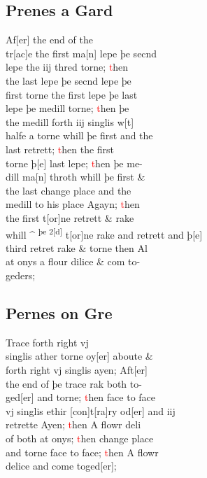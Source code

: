 \documentclass[12pt,letter]{article} %
\newcommand{\red}[1]{\textcolor{red}{#1}}
\newcommand{\srcpg}[1]{
    \noindent{
        \color{Gray}{\rule[0.5ex]{\linewidth}{1pt}~#1} 
        \\
    }
}
\begin{document}
\subsection{Prenes a Gard}
Af{[}er{]} the end of the\\
tr{[}ac{]}e the first ma{[}n{]} lepe þe secnd\\
lepe the iij thred torne; \red{t}hen\\
the last lepe þe secnd lepe þe\\
first torne the first lepe þe last\\
lepe þe medill torne; \red{t}hen þe\\ 
the medill forth iij singlis w{[}t{]}\\
halfe a torne whill þe first and the\\
last retrett; \red{t}hen the first\\
torne þ{[}e{]} last lepe; \red{t}hen þe me-\\
dill ma{[}n{]} throth whill þe first \&\\
the last change place and the\\
medill to his place Agayn; \red{t}hen\\
the first t{[}or{]}ne retrett \& rake\\
\srcpg{60} whill \^{} \textsuperscript{þe 2{[}d{]}} t{[}or{]}ne rake and retrett and þ{[}e{]}\\
third retret rake \& torne then Al\\
at onys a flour dilice \& com to-\\
geders;

\subsection{Pernes on Gre}
Trace forth right vj\\
singlis ather torne oy{[}er{]} aboute \&\\
forth right vj singlis ayen; Aft{[}er{]}\\
the end of þe trace rak both to-\\
ged{[}er{]} and torne; \red{t}hen face to face\\
vj singlis  ethir {[}con{]}t{[}ra{]}ry od{[}er{]} and iij\\
retrette Ayen; \red{t}hen A flowr deli\\
of both at onys; \red{t}hen change place\\
and torne face to face; \red{t}hen A flowr\\
delice and come toged{[}er{]};
\end{document}
